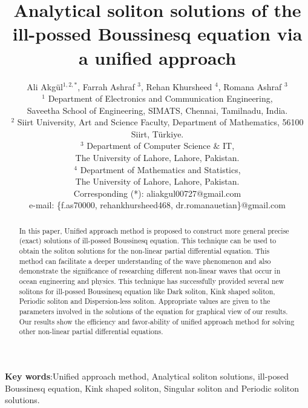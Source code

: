 \documentclass{article}
\date{}
\numberwithin{equation}{section}
\begin{document}
\title{ \textbf{Analytical soliton solutions of the ill-possed Boussinesq equation via a unified approach}}
\author{ Ali Akg\"{u}l$^{1,2,*}$, Farrah Ashraf $^{3}$, Rehan Khursheed $^{4}$, Romana Ashraf $^{3}$ \\
$^{1}$ Department of Electronics and Communication Engineering,\\ Saveetha School of Engineering,
SIMATS, Chennai, Tamilnadu, India.\\
$^{2}$ Siirt University, Art and Science Faculty, Department of Mathematics, 56100 Siirt, Türkiye.\\
$^{3}$ Department of Computer Science $ \& $ IT,\\ The University of Lahore, Lahore, Pakistan.\\
$^{4}$ Department of Mathematics and Statistics,\\ The University of Lahore, Lahore, Pakistan.\\
Corresponding (*): aliakgul00727@gmail.com\\
e-mail: \{f.as70000, rehankhursheed468, dr.romanauetian\}@gmail.com }
\date{ }
\maketitle
\begin{abstract}
\noindent
In this paper, Unified approach method is proposed to construct more general precise (exact) solutions of ill-possed Boussinesq equation. This technique can be used to obtain the soliton solutions for the non-linear partial differential equation. This method can facilitate a deeper understanding of the wave phenomenon and also demonstrate the significance of researching different non-linear waves that occur in ocean engineering and physics. This technique has successfully provided several new solitons for ill-possed Boussinesq equation like Dark soliton, Kink shaped soliton, Periodic soliton and Dispersion-less soliton. Appropriate values are given to the parameters involved in the solutions of the equation for graphical view of our results. Our results show the efficiency and favor-ability of unified approach method for solving other non-linear partial differential equations.
\end{abstract}
\textbf{Key words}:Unified approach method, Analytical soliton solutions, ill-posed Boussinesq equation, Kink shaped soliton, Singular soliton and Periodic soliton solutions.
\end{document}
